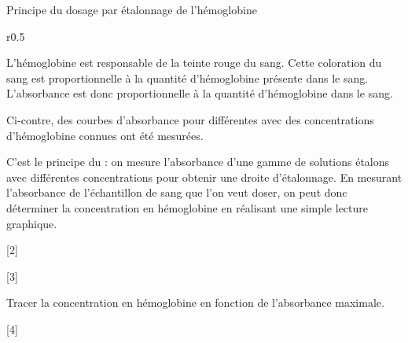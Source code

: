 \begin{doc}{Principe du dosage par étalonnage de l'hémoglobine}
  \begin{wrapfigure}[10]{r}{0.5\linewidth}
    \centering
    \vspace*{-18pt}
  \end{wrapfigure}
  
  L'hémoglobine est responsable de la teinte rouge du sang.
  Cette coloration du sang est proportionnelle à la quantité d'hémoglobine présente dans le sang.
  L'absorbance est donc proportionnelle à la quantité d'hémoglobine dans le sang.
  
  Ci-contre, des courbes d'absorbance pour différentes  avec des concentrations d'hémoglobine connues ont été mesurées.
  
  C'est le principe du  : on mesure l'absorbance d'une gamme de solutions étalons avec différentes concentrations pour obtenir une droite d'étalonnage.
  En  mesurant l'absorbance de l'échantillon de sang que l'on veut doser, on peut donc déterminer la concentration en hémoglobine en réalisant une simple lecture graphique.
\end{doc}

[2]

[3]

\schematisation Tracer la concentration en hémoglobine en fonction de l'absorbance maximale.

[4]


